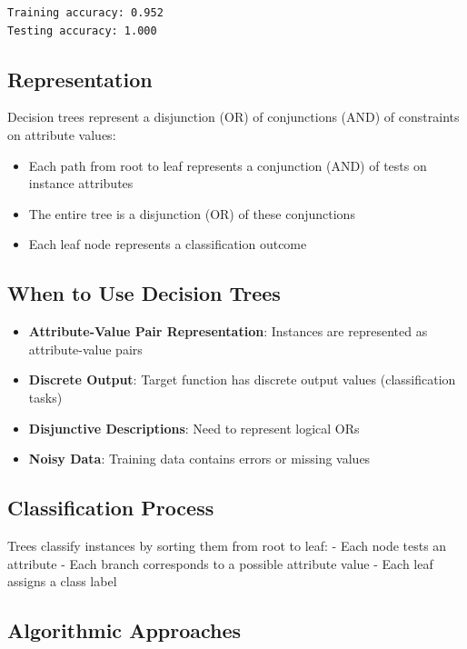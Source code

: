 \documentclass[
  letterpaper,
  DIV=11,
  numbers=noendperiod]{scrreprt}
\providecommand{\tightlist}{%
  \setlength{\itemsep}{0pt}\setlength{\parskip}{0pt}}\usepackage{longtable,booktabs,array}
\begin{document}
\begin{verbatim}
Training accuracy: 0.952
Testing accuracy: 1.000
\end{verbatim}

\subsection{Representation}\label{representation}

Decision trees represent a disjunction (OR) of conjunctions (AND) of
constraints on attribute values:

\begin{itemize}
\tightlist
\item
  Each path from root to leaf represents a conjunction (AND) of tests on
  instance attributes
\item
  The entire tree is a disjunction (OR) of these conjunctions
\item
  Each leaf node represents a classification outcome
\end{itemize}

\subsection{When to Use Decision
Trees}\label{when-to-use-decision-trees}

\begin{itemize}
\tightlist
\item
  \textbf{Attribute-Value Pair Representation}: Instances are
  represented as attribute-value pairs
\item
  \textbf{Discrete Output}: Target function has discrete output values
  (classification tasks)
\item
  \textbf{Disjunctive Descriptions}: Need to represent logical ORs
\item
  \textbf{Noisy Data}: Training data contains errors or missing values
\end{itemize}

\subsection{Classification Process}\label{classification-process}

Trees classify instances by sorting them from root to leaf: - Each node
tests an attribute - Each branch corresponds to a possible attribute
value - Each leaf assigns a class label

\subsection{Algorithmic Approaches}\label{algorithmic-approaches}
\end{document}
